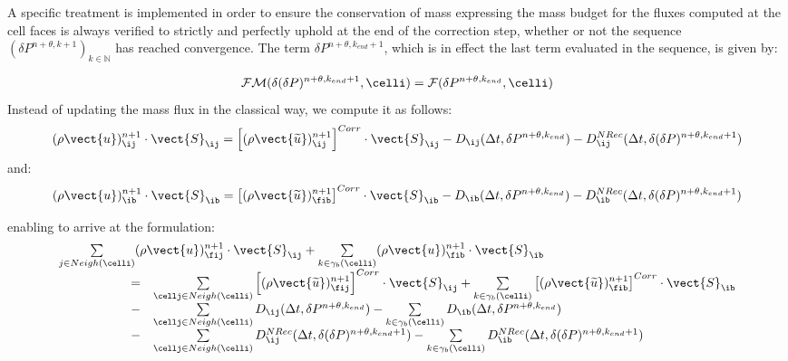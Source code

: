 \begin{remark}
A specific treatment is implemented in order to ensure the conservation of
mass expressing the mass budget for the fluxes computed at the cell faces
is always verified to strictly and perfectly uphold at the end of
the correction step, whether or not the sequence
$(\delta P^{n+\theta,k+1})_{k\in \mathbb{N}}$ has
reached convergence. The term $\delta P^{n+\theta,k_{end}+1}$, which is in
effect the last term evaluated in the sequence, is given by:

\begin{equation}\label{resol_pression_derniere_it}
\mathcal{FM}(\delta(\delta P)^{n+\theta,k_{end}+1}, \celli) = \mathcal{F}(\delta P^{n+\theta,k_{end}}, \celli)
\end{equation}
Instead of updating the mass flux in the classical way, we compute it as
follows:
\begin{equation*}
(\rho \vect{u})^{n+1}_{\ij} \cdot \vect{S}_{\ij} =
\left[(\rho \vect{\widetilde{u}})^{n+1}_{\ij}\right]^{Corr} \cdot \vect{S}_{\ij}
-D_{\ij}(\Delta t,\delta P^{n+\theta,k_{end}})
-D^{NRec}_{\ij}(\Delta t,\delta (\delta P)^{n+\theta,k_{end}+1})
\end{equation*}
and:
\begin{equation*}
(\rho \vect{u})^{n+1}_{\ib} \cdot \vect{S}_{\ib} =
\left[(\rho \vect{\widetilde{u}})^{n+1}_{\fib}\right]^{Corr} \cdot \vect{S}_{\ib}
-D_{\ib}(\Delta t,\delta P^{n+\theta,k_{end}})
-D^{NRec}_{\ib}(\Delta t,\delta (\delta P)^{n+\theta,k_{end}+1})
\end{equation*}

enabling to arrive at the formulation:
\begin{equation*}\notag
\begin{array}{ll}
\multicolumn{2}{l}{\sum\limits_{j\in Neigh(\celli)}(\rho
\vect{u})^{n+1}_{\fij}\cdot  \vect{S}_{\ij}
+\sum\limits_{k\in {\gamma_b(\celli)}}(\rho\vect{u})^{n+1}_{\fib} \cdot \vect{S}_{\ib}}\\
\hspace*{2cm}=&
\sum\limits_{\cellj \in Neigh(\celli)}{\left[(\rho \vect{\widetilde{u}})^{n+1}_{\fij}\right]^{Corr} \cdot
\vect{S}_{\ij}}
+ \sum\limits_{k\in {\gamma_b(\celli)}}\left[(\rho\vect{\widetilde{u}})^{n+1}_{\fib}\right]^{Corr} \cdot \vect{S}_{\ib} \\
\hspace*{2cm}-&\sum\limits_{\cellj \in Neigh(\celli)}
D_{\ij}(\Delta t,\delta P^{n+\theta,k_{end}})
-\sum\limits_{k\in {\gamma_b(\celli)}}  D_{\ib}(\Delta t,\delta
P^{n+\theta,k_{end}})\\
\hspace*{2cm}-&{\sum\limits_{\cellj \in Neigh(\celli)} D^{NRec}_{\ij}(\Delta t,\delta (\delta
P)^{n+\theta,k_{end}+1})}
-\sum\limits_{k\in {\gamma_b(\celli)}} D^{NRec}_{\ib}(\Delta t,\delta
(\delta P)^{n+\theta,k_{end}+1})
\end{array}
\end{equation*}



\end{remark}

